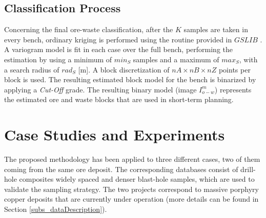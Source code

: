 

\subsection{Classification Process}
Concerning the final ore-waste classification, after the $K$ samples are taken in every bench, ordinary kriging is performed using the routine provided in $GSLIB$ \citep{Deutsch_1998_a}. A variogram model is fit in each case over the full bench, performing the estimation by using a minimum of $min_S$ samples and a maximum of $max_S$, with a search radius of $rad_S$ [m]. A block discretization of $nA \times nB \times nZ$ points per block is used. The resulting estimated block model for the bench is binarized by applying a \emph{Cut-Off} grade. The resulting binary model (image $I_{o-w}^{m}$) represents the estimated ore and waste blocks that are used in short-term planning.

\section{Case Studies and Experiments}

The proposed methodology has been applied to three different cases, two of them coming from the same ore deposit. The corresponding databases consist of drill-hole composites widely spaced and denser blast-hole samples, which are used to validate the sampling strategy. The two projects correspond to massive porphyry copper deposits that are currently under operation (more details can be found in Section \ref{subs_dataDescription}).

